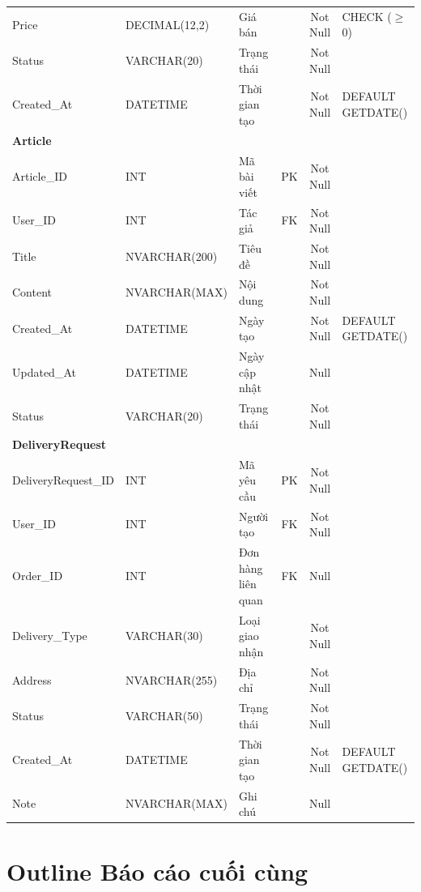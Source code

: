 \documentclass[12pt,a4paper]{article}
\begin{document}
\begin{longtable}{|l|l|p{4.2cm}|c|c|p{3.5cm}|}
Price & DECIMAL(12,2) & Giá bán & & Not Null & CHECK ($\geq$ 0) \\
Status & VARCHAR(20) & Trạng thái & & Not Null & \\
Created\_At & DATETIME & Thời gian tạo & & Not Null & DEFAULT GETDATE() \\
\hline
\multicolumn{6}{|l|}{\textbf{Article}} \\
\hline
Article\_ID & INT & Mã bài viết & PK & Not Null & \\
User\_ID & INT & Tác giả & FK & Not Null & \\
Title & NVARCHAR(200) & Tiêu đề & & Not Null & \\
Content & NVARCHAR(MAX) & Nội dung & & Not Null & \\
Created\_At & DATETIME & Ngày tạo & & Not Null & DEFAULT GETDATE() \\
Updated\_At & DATETIME & Ngày cập nhật & & Null & \\
Status & VARCHAR(20) & Trạng thái & & Not Null & \\
\hline
\multicolumn{6}{|l|}{\textbf{DeliveryRequest}} \\
\hline
DeliveryRequest\_ID & INT & Mã yêu cầu & PK & Not Null & \\
User\_ID & INT & Người tạo & FK & Not Null & \\
Order\_ID & INT & Đơn hàng liên quan & FK & Null & \\
Delivery\_Type & VARCHAR(30) & Loại giao nhận & & Not Null & \\
Address & NVARCHAR(255) & Địa chỉ & & Not Null & \\
Status & VARCHAR(50) & Trạng thái & & Not Null & \\
Created\_At & DATETIME & Thời gian tạo & & Not Null & DEFAULT GETDATE() \\
Note & NVARCHAR(MAX) & Ghi chú & & Null & \\
\hline
\end{longtable}

\section{Outline Báo cáo cuối cùng}
\end{document}
